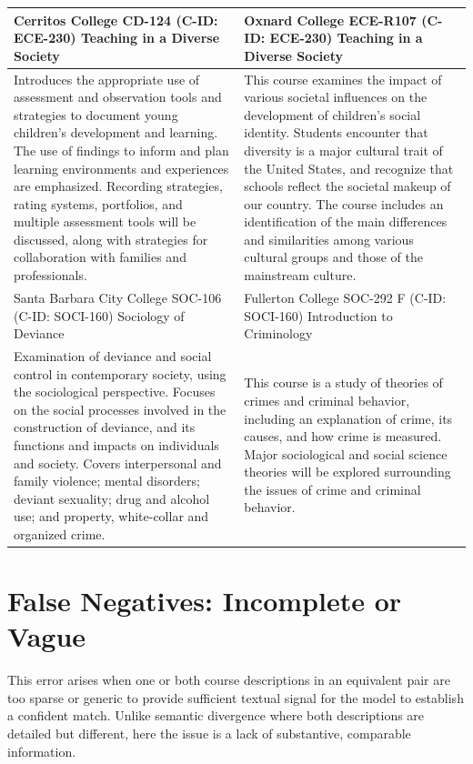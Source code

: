 {\begin{longtable}{ >{\baselineskip=12pt}p{}  >{\baselineskip=12pt}p{} }
\bottomrule\toprule
Cerritos College \newline CD-124 (C-ID: ECE-230) \newline Teaching in a Diverse Society & Oxnard College \newline ECE-R107 (C-ID: ECE-230) \newline Teaching in a Diverse Society \\
\midrule
Introduces the appropriate use of assessment and observation tools and strategies to document young children’s development and learning. The use of findings to inform and plan learning environments and experiences are emphasized. Recording strategies, rating systems, portfolios, and multiple assessment tools will be discussed, along with strategies for collaboration with families and professionals. & This course examines the impact of various societal influences on the development of children's social identity. Students encounter that diversity is a major cultural trait of the United States, and recognize that schools reflect the societal makeup of our country. The course includes an identification of the main differences and similarities among various cultural groups and those of the mainstream culture. \\
\bottomrule\toprule
Santa Barbara City College \newline SOC-106 (C-ID: SOCI-160) \newline Sociology of Deviance & Fullerton College \newline SOC-292 F (C-ID: SOCI-160) \newline Introduction to Criminology \\
\midrule
Examination of deviance and social control in contemporary society, using the sociological perspective. Focuses on the social processes involved in the construction of deviance, and its functions and impacts on individuals and society. Covers interpersonal and family violence; mental disorders; deviant sexuality; drug and alcohol use; and property, white-collar and organized crime. & This course is a study of theories of crimes and criminal behavior, including an explanation of crime, its causes, and how crime is measured. Major sociological and social science theories will be explored surrounding the issues of crime and criminal behavior. \\
\bottomrule\toprule
\end{longtable}
}

\section{False Negatives: Incomplete or Vague}\label{app:fnvague}
This error arises when one or both course descriptions in an equivalent pair are too sparse or generic to provide sufficient textual signal for the model to establish a confident match. Unlike semantic divergence where both descriptions are detailed but different, here the issue is a lack of substantive, comparable information.

